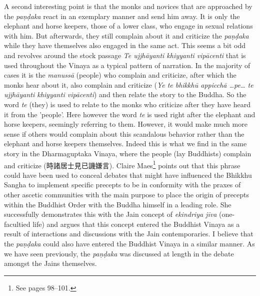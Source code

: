 A second interesting point is that the monks and novices that are approached by the {\em paṇḍaka} react in an exemplary manner and send him away. It is only the elephant and horse keepers, those of a lower class, who engage in sexual relations with him. But afterwards, they still complain about it and criticize the {\em paṇḍaka} while they have themselves also engaged in the same act. This seems a bit odd and revolves around the stock passage {\em Te ujjhāyanti khiyyanti vipācenti} that is used throughout the Vinaya as a typical pattern of narration. In the majority of cases it is the {\em manussā} (people) who complain and criticize, after which the monks hear about it, also complain and criticize ({\em Ye te bhikkhū appicchā …pe… te ujjhāyanti khiyyanti vipācenti}) and then relate the story to the Buddha. So the word {\em te} (they) is used to relate to the monks who criticize after they have heard it from the 'people'. Here however the word {\em te} is used right after the elephant and horse keepers, seemingly referring to them. However, it would make much more sense if others would complain about this scandalous behavior rather than the elephant and horse keepers themselves. Indeed this is what we find in the same story in the Dharmaguptaka Vinaya, where the people (lay Buddhists) complain and criticize (時諸居士見已譏嫌言). Claire Maes\footnote{See \cite{maes2011} pages 98–101.} points out that this phrase could have been used to conceal debates that might have influenced the Bhikkhu Sangha to implement specific precepts to be in conformity with the praxes of other ascetic communities with the main purpose to place the origin of precepts within the Buddhist Order with the Buddha himself in a leading role. She successfully demonstrates this with the Jain concept of {\em ekindriya jīva} (one-facultied life) and argues that this concept entered the Buddhist Vinaya as a result of interactions and discussions with the Jain contemporaries. I believe that the {\em paṇḍaka} could also have entered the Buddhist Vinaya in a similar manner. As we have seen previously, the {\em paṇḍaka} was discussed at length in the debate amongst the Jains themselves.

